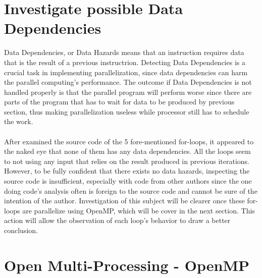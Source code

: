 \section{Investigate possible Data Dependencies}

Data Dependencies, or Data Hazards means that an instruction requires data that is the result of a previous instructrion. Detecting Data Dependencies is a crucial task in implementing parallelization, since data dependencies can harm the parallel computing's performance. The outcome if Data Dependencies is not handled properly is that the parallel program will perform worse since there are parts of the program that has to wait for data to be produced by previous section, thus making parallelization useless while processor still has to schedule the work. \\
~\\
After examined the source code of the 5 fore-mentioned for-loops, it appeared to the naked eye that none of them has any data dependencies. All the loops seem to not using any input that relies on the result produced in previous iterations. However, to be fully confident that there exists no data hazards, inspecting the source code is insufficient, especially with code from other authors since the one doing code's analysis often is foreign to the source code and cannot be sure of the intention of the author. Investigation of this subject will be clearer once these for-loops are parallelize using OpenMP, which will be cover in the next section. This action will allow the observation of each loop's behavior to draw a better conclusion. \\

\section{Open Multi-Processing - OpenMP}

